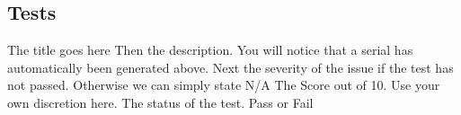 \subsection{Tests}
\FuncReq
{The title goes here}
{Then the description. You will notice that a serial has automatically been generated above.}
{Next the severity of the issue if the test has not passed. Otherwise we can simply state N/A}
{The Score out of 10. Use your own discretion here.}
{The status of the test. Pass or Fail}

